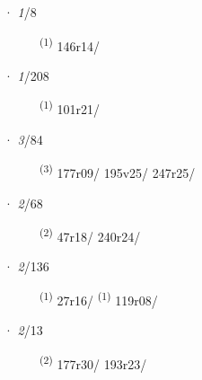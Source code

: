 \noindent{} · \textit{1}/8 \LEMMALINE
\begin{description}
    \item[]  \textsuperscript{(1)} \mbox{146r14/}
\end{description}
\ENTRYEND
\noindent{} · \textit{1}/208 \LEMMALINE
\begin{description}
    \item[]  \textsuperscript{(1)} \mbox{101r21/}
\end{description}
\ENTRYEND
\noindent{} · \textit{3}/84 \LEMMALINE
\begin{description}
    \item[]  \textsuperscript{(3)} \mbox{177r09/} \mbox{195v25/} \mbox{247r25/}
\end{description}
\ENTRYEND
\noindent{} · \textit{2}/68 \LEMMALINE
\begin{description}
    \item[]  \textsuperscript{(2)} \mbox{47r18/} \mbox{240r24/}
\end{description}
\ENTRYEND
\noindent{} · \textit{2}/136 \LEMMALINE
\begin{description}
    \item[]  \textsuperscript{(1)} \mbox{27r16/} \textsuperscript{(1)} \mbox{119r08/}
\end{description}
\ENTRYEND
\noindent{} · \textit{2}/13 \LEMMALINE
\begin{description}
    \item[]  \textsuperscript{(2)} \mbox{177r30/} \mbox{193r23/}
\end{description}
